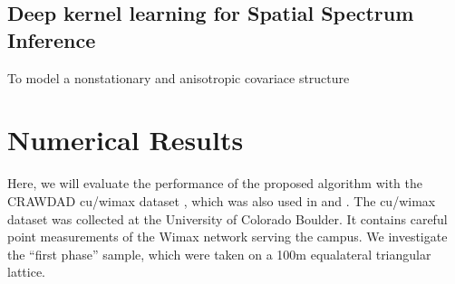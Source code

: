 \documentclass[journal, oneside, twocolumn]{IEEEtran}
\begin{document}
\subsection{Deep kernel learning for Spatial Spectrum Inference}
To model a nonstationary and anisotropic covariace structure

\section{Numerical Results}
Here, we will evaluate the performance of the proposed algorithm with the CRAWDAD cu/wimax dataset \cite{Ton2012}, which was also used in \cite{Phillips2012} and \cite{Hu2020}. The cu/wimax dataset was collected at the University of Colorado Boulder. It contains careful point measurements of the Wimax network serving the campus. We investigate the ``first phase'' sample, which were taken on a 100m equalateral triangular lattice. 





\section{}
\subsection{}


\ifCLASSOPTIONcaptionsoff
\newpage
\fi






\end{document}
